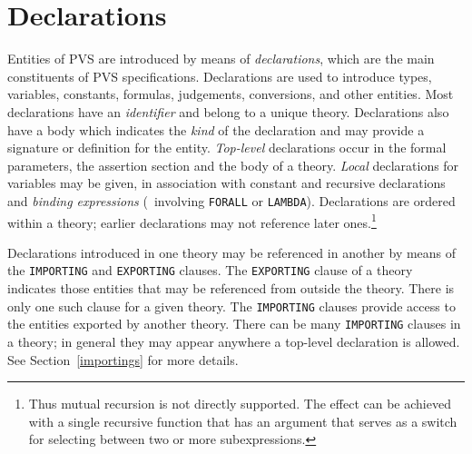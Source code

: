 
\chapter{Declarations}\label{declarations}

Entities of PVS are introduced by means of \emph{declarations}, which are
the main constituents of PVS specifications.  Declarations are used to
introduce types, variables, constants, formulas, judgements, conversions,
and other entities.  Most declarations have an \emph{identifier} and
belong to a unique theory.  Declarations also have a body which indicates
the \emph{kind} of the declaration and may provide a signature or
definition for the entity.  \emph{Top-level}
declarations occur in the formal parameters,
the assertion section and the body of a theory.  \emph{Local}
declarations for variables may be given, in
association with constant and recursive declarations and \emph{binding
expressions} (\eg\ involving \texttt{FORALL} or \texttt{LAMBDA}).
Declarations are ordered within a theory; earlier declarations may not
reference later ones.\footnote{Thus mutual recursion is not directly
supported.  The effect can be achieved with a single recursive function
that has an argument that serves as a switch for selecting between two or
more subexpressions.}

Declarations introduced in one theory may be referenced in another by
means of the \texttt{IMPORTING} and \texttt{EXPORTING} clauses.  The
\texttt{EXPORTING} clause of a theory indicates those entities that may be
referenced from outside the theory.  There is only one such clause for a
given theory.  The \texttt{IMPORTING} clauses provide access to the
entities exported by another theory.  There can be many \texttt{IMPORTING}
clauses in a theory; in general they may appear anywhere a top-level
declaration is allowed.  See Section~\ref{importings} for more details.

